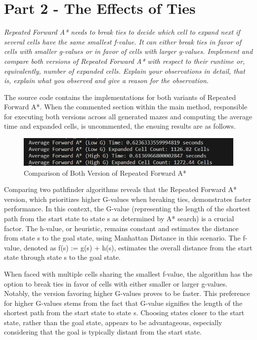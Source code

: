 \graphicspath{{Images/}}

\section{Part 2 - The Effects of Ties}

\textit{Repeated Forward A* needs to break ties to decide which cell to expand next if
several cells have the same smallest f-value. It can either break ties in favor of cells with smaller g-values or in favor of
cells with larger g-values. Implement and compare both versions of Repeated Forward A* with respect to their runtime or,
equivalently, number of expanded cells. Explain your observations in detail, that is, explain what you observed and give a
reason for the observation.}


The source code contains the implementations for both variants of Repeated Forward A*. When the commented section within the main method, responsible for executing both versions across all generated mazes and computing the average time and expanded cells, is uncommented, the ensuing results are as follows.

\begin{figure}[h]
    \centering
    \includegraphics[width=.85\linewidth]{imgs/Results of Both Forward A Methods.png}
    \caption{Comparison of Both Version of Repeated Forward A*}
    \label{fig:my_label}
\end{figure}


Comparing two pathfinder algorithms reveals that the Repeated Forward A* version, which prioritizes higher G-values when breaking ties, demonstrates faster performance. In this context, the G-value (representing the length of the shortest path from the start state to state s as determined by A* search) is a crucial factor. The h-value, or heuristic, remains constant and estimates the distance from state s to the goal state, using Manhattan Distance in this scenario. The f-value, denoted as f(s) := g(s) + h(s), estimates the overall distance from the start state through state s to the goal state.

When faced with multiple cells sharing the smallest f-value, the algorithm has the option to break ties in favor of cells with either smaller or larger g-values. Notably, the version favoring higher G-values proves to be faster. This preference for higher G-values stems from the fact that G-value signifies the length of the shortest path from the start state to state s. Choosing states closer to the start state, rather than the goal state, appears to be advantageous, especially considering that the goal is typically distant from the start state.

